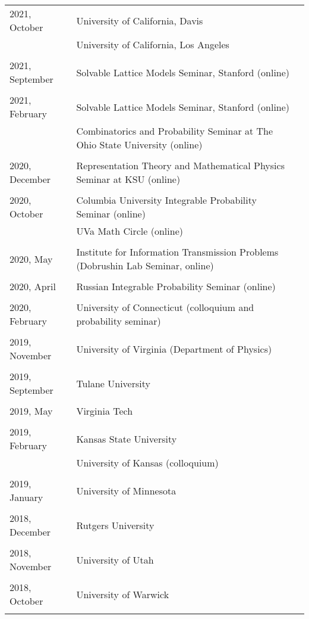 \documentclass[letterpaper,11pt]{article}
\begin{document}
\begin{longtable}{llc}
	2021, October
	& University of California, Davis
	\\
	& University of California, Los Angeles
	\\\\
	2021, September
	& Solvable Lattice Models Seminar, Stanford (online)
	\\\\
	2021, February
	& Solvable Lattice Models Seminar, Stanford (online)
	\\
	&
	Combinatorics and Probability Seminar at The Ohio State University (online)
	\\\\
	2020, December
	& Representation Theory and Mathematical Physics Seminar at KSU (online)
	\\\\
	2020, October
	& Columbia University Integrable Probability Seminar (online)
	\\
	&
	UVa Math Circle (online)
	\\\\
	2020, May
	& Institute for Information Transmission Problems
	(Dobrushin Lab Seminar, online)
	\\\\
	2020, April
	& Russian Integrable Probability Seminar (online)
	\\\\
	2020, February
	& University of Connecticut (colloquium and probability seminar)
	\\\\
	2019, November
	& University of Virginia (Department of Physics)
	\\\\
	2019, September
	& Tulane University
	\\\\
	2019, May
	& Virginia Tech
	\\\\
	2019, February
	& Kansas State University \\
	& University of Kansas (colloquium)
	\\\\
	2019, January
	& University of Minnesota
	\\\\
	2018, December
	& Rutgers University
	\\\\
	2018, November
	& University of Utah
	\\\\
	2018, October
	& University of Warwick
	\\\\

\end{longtable}
\end{document}
